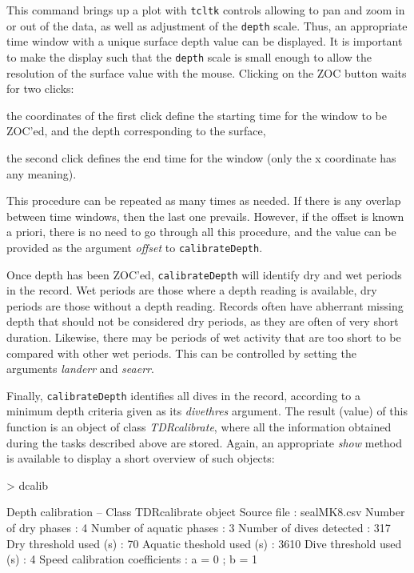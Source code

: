 \documentclass[12pt, letterpaper]{scrartcl}
\newcommand{\Robject}[1]{{\texttt{#1}}}
\newcommand{\Rfunction}[1]{{\texttt{#1}}}
\newcommand{\Rpackage}[1]{{\texttt{#1}}}
\newcommand{\Rclass}[1]{{\textit{#1}}}
\newcommand{\Rmethod}[1]{{\textit{#1}}}
\newcommand{\Rfunarg}[1]{{\textit{#1}}}
\begin{document}
This command brings up a plot with \Rpackage{tcltk} controls allowing to
pan and zoom in or out of the data, as well as adjustment of the
\Robject{depth} scale.  Thus, an appropriate time window with a unique
surface depth value can be displayed.  It is important to make the display
such that the \Robject{depth} scale is small enough to allow the
resolution of the surface value with the mouse.  Clicking on the ZOC
button waits for two clicks:
\begin{compactenum}
\item the coordinates of the first click define the starting time for the
  window to be ZOC'ed, and the depth corresponding to the surface,
\item the second click defines the end time for the window (only the x
  coordinate has any meaning).
\end{compactenum}
This procedure can be repeated as many times as needed.  If there is any
overlap between time windows, then the last one prevails.  However, if the
offset is known a priori, there is no need to go through all this
procedure, and the value can be provided as the argument \Rfunarg{offset}
to \Rfunction{calibrateDepth}.

Once depth has been ZOC'ed, \Rfunction{calibrateDepth} will identify dry
and wet periods in the record.  Wet periods are those where a depth
reading is available, dry periods are those without a depth reading.
Records often have abherrant missing depth that should not be considered
dry periods, as they are often of very short duration.  Likewise, there
may be periods of wet activity that are too short to be compared with
other wet periods.  This can be controlled by setting the arguments
\Rfunarg{landerr} and \Rfunarg{seaerr}.

Finally, \Rfunction{calibrateDepth} identifies all dives in the record,
according to a minimum depth criteria given as its \Rfunarg{divethres}
argument.  The result (value) of this function is an object of class
\Rclass{TDRcalibrate}, where all the information obtained during the tasks
described above are stored.  Again, an appropriate \Rmethod{show} method
is available to display a short overview of such objects:
\begin{Schunk}
\begin{Sinput}
> dcalib
\end{Sinput}
\begin{Soutput}
Depth calibration -- Class TDRcalibrate object
  Source file                       : sealMK8.csv 
  Number of dry phases              : 4 
  Number of aquatic phases          : 3 
  Number of dives detected          : 317 
  Dry threshold used (s)            : 70 
  Aquatic theshold used (s)         : 3610 
  Dive threshold used (s)           : 4 
  Speed calibration coefficients : a = 0 ; b = 1 
\end{Soutput}
\end{Schunk}
\end{document}
